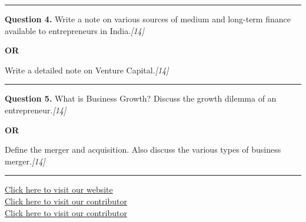 \documentclass[11pt,a4paper]{article}
\newcommand{\pts}[1]{\hfill   \textit{[#1]}}
\begin{document}
\medskip\rule{\linewidth}{0.2pt}




\noindent   \textbf{Question 4.}
Write a note on various sources of medium and long-term finance available to entrepreneurs in India.\pts{14}

\centerline{   \textbf{OR}}

Write a detailed note on Venture Capital.\pts{14}

\medskip\rule{\linewidth}{0.2pt}




\noindent   \textbf{Question 5.}
What is Business Growth? Discuss the growth dilemma of an entrepreneur.\pts{14}

\centerline{   \textbf{OR}}

Define the merger and acquisition. Also discuss the various types of business merger.\pts{14}

\vfill
\rule{\linewidth}{0.4pt}

\begin{center}\small
\href{https://bhu-exam.vercel.app/}{Click here to visit our website}\\[4pt]
\href{https://me-aryan.vercel.app/}{Click here to visit our contributor}\\[4pt]
\href{https://quashan-me.vercel.app/}{Click here to visit our contributor}
\end{center}
\end{document}
